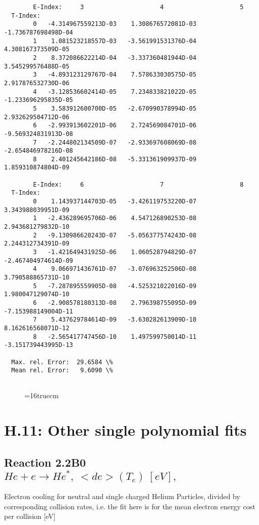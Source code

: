 \documentclass[12pt,dvipdfmx]{article}
\begin{document}
{\begin{small}
\begin{verbatim}
        E-Index:     3                     4                     5
  T-Index:
        0   -4.314967559213D-03    1.308676572081D-03   -1.736787698498D-04
        1    1.081523218557D-03   -3.561991531376D-04    4.308167373509D-05
        2    8.372086622214D-04   -3.337360481944D-04    3.545299576488D-05
        3   -4.893123129767D-04    7.578633030575D-05    2.917876532730D-06
        4   -3.128536602414D-05    7.234833821022D-05   -1.233696295835D-05
        5    3.583912600700D-05   -2.670990378994D-05    2.932629504712D-06
        6   -2.993913602201D-06    2.724569084701D-06   -9.569324831913D-08
        7   -2.244802134509D-07   -2.933697608069D-08   -2.654846978216D-08
        8    2.401245642186D-08   -5.331361909937D-09    1.859310874804D-09

        E-Index:     6                     7                     8
  T-Index:
        0    1.143937144703D-05   -3.426119753220D-07    3.343988039951D-09
        1   -2.436289695706D-06    4.547126890253D-08    2.943681279832D-10
        2   -9.130986620243D-07   -5.056377574243D-08    2.244312734391D-09
        3   -1.421649431925D-06    1.060528794829D-07   -2.467404974614D-09
        4    9.066971436761D-07   -3.076963252506D-08    3.790588865731D-10
        5   -7.287895559905D-08   -4.525321022016D-09    1.980047129074D-10
        6   -2.908578180313D-08    2.796398755095D-09   -7.153988149004D-11
        7    5.437629784614D-09   -3.630282613909D-10    8.162616568071D-12
        8   -2.565417747456D-10    1.497599750014D-11   -3.151739443995D-13

  Max. rel. Error:  29.6584 \%
  Mean rel. Error:   9.6090 \%


\end{verbatim}\end{small}
\begin{figure} \label{2.3.8rl}
\epsfxsize=16truecm 
\end{figure}
\newpage

\section{H.11: Other single polynomial fits}

\subsection{
Reaction 2.2B0   $ He + e  \rightarrow He^*,    \ <de>(T_e) \ [eV], $
}

  Electron cooling for neutral and single
  charged Helium Particles, divided by corresponding collision rates, i.e. the fit here is for the mean electron energy cost per collision [eV]

}
\end{document}
